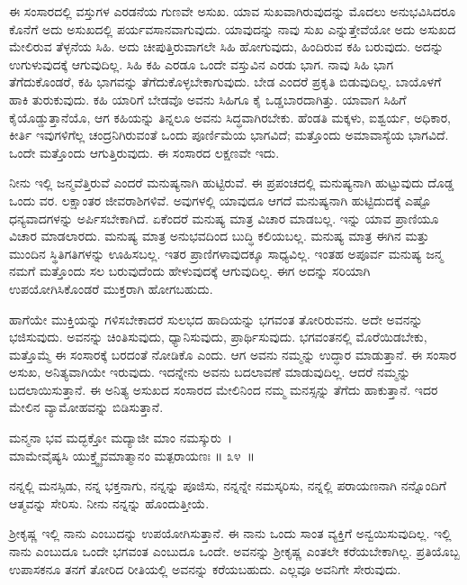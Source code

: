 ಈ ಸಂಸಾರದಲ್ಲಿ ವಸ್ತುಗಳ ಎರಡನೆಯ ಗುಣವೇ ಅಸುಖ. ಯಾವ ಸುಖವಾಗಿರುವುದನ್ನು ಮೊದಲು ಅನುಭವಿಸಿದರೂ ಕೊನೆಗೆ ಅದು ಅಸುಖದಲ್ಲಿ ಪರ್ಯವಸಾನವಾಗುವುದು. ಯಾವು\-ದನ್ನು ನಾವು ಸುಖ ಎನ್ನುತ್ತೇವೆಯೋ ಅದು ಅಸುಖದ ಮೇಲಿರುವ ತೆಳ್ಳನೆಯ ಸಿಹಿ. ಅದು ಚೀಪುತ್ತಿರುವಾಗಲೇ ಸಿಹಿ ಹೋಗುವುದು, ಹಿಂದಿರುವ ಕಹಿ ಬರುವುದು. ಅದನ್ನು ಉಗುಳುವುದಕ್ಕೆ ಆಗುವುದಿಲ್ಲ. ಸಿಹಿ ಕಹಿ ಎರಡೂ ಒಂದೇ ವಸ್ತುವಿನ ಎರಡು ಭಾಗ. ನಾವು ಸಿಹಿ ಭಾಗ ತೆಗೆದುಕೊಂಡರೆ, ಕಹಿ ಭಾಗವನ್ನು ತೆಗೆದುಕೊಳ್ಳಬೇಕಾಗುವುದು. ಬೇಡ ಎಂದರೆ ಪ್ರಕೃತಿ ಬಿಡುವುದಿಲ್ಲ. ಬಾಯೊಳಗೆ ಹಾಕಿ ತುರುಕುವುದು. ಕಹಿ ಯಾರಿಗೆ ಬೇಡವೊ ಅವನು ಸಿಹಿಗೂ ಕೈ ಒಡ್ಡಬಾರದಾಗಿತ್ತು. ಯಾವಾಗ ಸಿಹಿಗೆ ಕೈಯೊಡ್ಡುತ್ತಾನೆಯೊ, ಆಗ ಕಹಿಯನ್ನು ತಿನ್ನಲೂ ಅವನು ಸಿದ್ಧವಾಗಿರಬೇಕು. ಹೆಂಡತಿ ಮಕ್ಕಳು, ಐಶ್ವರ್ಯ, ಅಧಿಕಾರ, ಕೀರ್ತಿ ಇವುಗಳಿಗೆಲ್ಲ ಚಂದ್ರನಿಗಿರುವಂತೆ ಒಂದು ಪೂರ್ಣಿಮೆಯ ಭಾಗವಿದೆ; ಮತ್ತೊಂದು ಅಮಾವಾಸ್ಯೆಯ ಭಾಗವಿದೆ. ಒಂದೇ ಮತ್ತೊಂದು ಆಗುತ್ತಿರುವುದು. ಈ ಸಂಸಾರದ ಲಕ್ಷಣವೇ ಇದು. 

ನೀನು ಇಲ್ಲಿ ಜನ್ಮವೆತ್ತಿರುವೆ ಎಂದರೆ ಮನುಷ್ಯನಾಗಿ ಹುಟ್ಟಿರುವೆ. ಈ ಪ್ರಪಂಚದಲ್ಲಿ ಮನುಷ್ಯನಾಗಿ ಹುಟ್ಟುವುದು ದೊಡ್ಡ ಒಂದು ವರ. ಲಕ್ಷಾಂತರ ಜೀವರಾಶಿಗಳಿವೆ. ಅವುಗಳಲ್ಲಿ ಯಾವುದೂ ಆಗದೆ ಮನುಷ್ಯನಾಗಿ ಹುಟ್ಟಿದುದಕ್ಕೆ ಎಷ್ಟೊ ಧನ್ಯವಾದಗಳನ್ನು ಅರ್ಪಿಸಬೇಕಾಗಿದೆ. ಏಕೆಂದರೆ ಮನುಷ್ಯ ಮಾತ್ರ ವಿಚಾರ ಮಾಡಬಲ್ಲ. ಇನ್ನು ಯಾವ ಪ್ರಾಣಿಯೂ ವಿಚಾರ ಮಾಡಲಾರದು. ಮನುಷ್ಯ ಮಾತ್ರ ಅನುಭವದಿಂದ ಬುದ್ಧಿ ಕಲಿಯಬಲ್ಲ. ಮನುಷ್ಯ ಮಾತ್ರ ಈಗಿನ ಮತ್ತು ಮುಂದಿನ ಸ್ಥಿತಿಗತಿಗಳನ್ನು ಊಹಿಸಬಲ್ಲ. ಇತರ ಪ್ರಾಣಿಗಳಾವುದಕ್ಕೂ ಸಾಧ್ಯವಿಲ್ಲ. ಇಂತಹ ಅಪೂರ್ವ ಮನುಷ್ಯ ಜನ್ಮ ನಮಗೆ ಮತ್ತೊಂದು ಸಲ ಬರುವುದೆಂದು ಹೇಳುವುದಕ್ಕೆ ಆಗುವುದಿಲ್ಲ. ಈಗ ಅದನ್ನು ಸರಿಯಾಗಿ ಉಪಯೋಗಿಸಿಕೊಂಡರೆ ಮುಕ್ತರಾಗಿ ಹೋಗಬಹುದು.

ಹಾಗೆಯೇ ಮುಕ್ತಿಯನ್ನು ಗಳಿಸಬೇಕಾದರೆ ಸುಲಭದ ಹಾದಿಯನ್ನು ಭಗವಂತ ತೋರಿರುವನು. ಅದೇ ಅವನನ್ನು ಭಜಿಸುವುದು. ಅವನನ್ನು ಚಿಂತಿಸುವುದು, ಧ್ಯಾನಿಸುವುದು, ಪ್ರಾರ್ಥಿಸುವುದು. ಭಗವಂತನಲ್ಲಿ ಮೊರೆಯಿಡಬೇಕು, ಮತ್ತೊಮ್ಮೆ ಈ ಸಂಸಾರಕ್ಕೆ ಬರದಂತೆ ನೋಡಿಕೊ ಎಂದು. ಆಗ ಅವನು ನಮ್ಮನ್ನು ಉದ್ಧಾರ ಮಾಡುತ್ತಾನೆ. ಈ ಸಂಸಾರ ಅಸುಖ, ಅನಿತ್ಯವಾಗಿಯೇ ಇರುವುದು. ಇದನ್ನೇನು ಅವನು ಬದಲಾವಣೆ ಮಾಡುವುದಿಲ್ಲ. ಆದರೆ ನಮ್ಮನ್ನು ಬದಲಾಯಿಸುತ್ತಾನೆ. ಈ ಅನಿತ್ಯ ಅಸುಖದ ಸಂಸಾರದ ಮೇಲಿನಿಂದ ನಮ್ಮ ಮನಸ್ಸನ್ನು ತೆಗೆದು ಹಾಕುತ್ತಾನೆ. ಇದರ ಮೇಲಿನ ವ್ಯಾಮೋಹವನ್ನು ಬಿಡಿಸುತ್ತಾನೆ.

\begin{shloka}
ಮನ್ಮನಾ ಭವ ಮದ್ಭಕ್ತೋ ಮದ್ಯಾಜೀ ಮಾಂ ನಮಸ್ಕುರು~।\\ಮಾಮೇವೈಷ್ಯಸಿ ಯುಕ್ತ್ವೈವಮಾತ್ಮಾನಂ ಮತ್ಪರಾಯಣಃ \hfill॥ ೩೪~॥
\end{shloka}

\begin{artha}
ನನ್ನಲ್ಲಿ ಮನಸ್ಸಿಡು, ನನ್ನ ಭಕ್ತನಾಗು, ನನ್ನನ್ನು ಪೂಜಿಸು, ನನ್ನನ್ನೇ ನಮಸ್ಕರಿಸು, ನನ್ನಲ್ಲಿ ಪರಾಯಣನಾಗಿ ನನ್ನೊಂದಿಗೆ ಆತ್ಮವನ್ನು ಸೇರಿಸು. ನೀನು ನನ್ನನ್ನು ಹೊಂದುತ್ತೀಯೆ.
\end{artha}

ಶ‍್ರೀಕೃಷ್ಣ ಇಲ್ಲಿ ನಾನು ಎಂಬುದನ್ನು ಉಪಯೋಗಿಸುತ್ತಾನೆ. ಈ ನಾನು ಒಂದು ಸಾಂತ ವ್ಯಕ್ತಿಗೆ ಅನ್ವಯಿಸುವುದಿಲ್ಲ. ಇಲ್ಲಿ ನಾನು ಎಂಬುದೂ ಒಂದೇ ಭಗವಂತ ಎಂಬುದೂ ಒಂದೇ. ಅವನನ್ನು ಶ‍್ರೀಕೃಷ್ಣ ಎಂತಲೇ ಕರೆಯಬೇಕಾಗಿಲ್ಲ. ಪ್ರತಿಯೊಬ್ಬ ಉಪಾಸಕನೂ ತನಗೆ ತೋರಿದ ರೀತಿಯಲ್ಲಿ ಅವನನ್ನು ಕರೆಯಬಹುದು. ಎಲ್ಲವೂ ಅವನಿಗೇ ಸೇರುವುದು.

